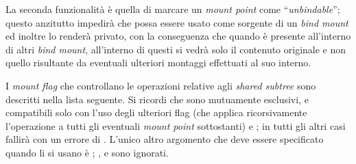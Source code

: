 La seconda funzionalità è quella di marcare un \textit{mount point} come
``\textit{unbindable}''; questo anzitutto impedirà che possa essere usato come
sorgente di un \textit{bind mount} ed inoltre lo renderà privato, con la
conseguenza che quando è presente all'interno di altri \textit{bind mount},
all'interno di questi si vedrà solo il contenuto originale e non quello
risultante da eventuali ulteriori montaggi effettuati al suo interno.


I \textit{mount flag} che controllano le operazioni relative agli
\textit{shared subtree} sono descritti nella lista seguente. Si ricordi che
sono mutuamente esclusivi, e compatibili solo con l'uso degli ulteriori flag
 (che applica ricorsivamente l'operazione a tutti gli eventuali
\textit{mount point} sottostanti) e ; in tutti gli altri
casi  fallirà con un errore di . L'unico altro
argomento che deve essere specificato quando li si usano è ;
,  e  sono ignorati.

